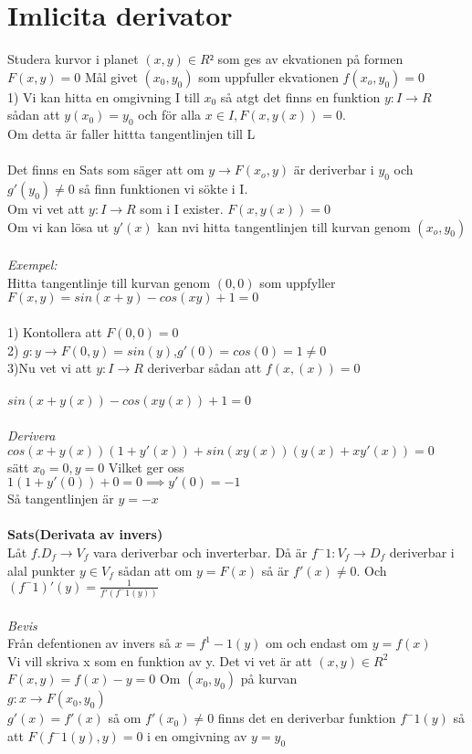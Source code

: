 \documentclass{article}
\begin{document}
	\section{Imlicita derivator} 
	Studera kurvor i planet $(x,y)\in R²$ som ges av ekvationen på formen $F(x,y)=0$
	Mål givet $(x_0,y_0)$ som uppfuller ekvationen $ f(x_o,y_0)=0 $ 
	\\
	1) Vi kan hitta en omgivning I till $x_0$ så atgt det finns en funktion $y:I\to R$ sådan att $y(x_0)=y_0$ och för alla $x\in I, F(x,y(x))=0$.\\
	Om detta är faller hittta tangentlinjen till L 
	\\\\
	Det finns en Sats som säger att om $y\to F(x_o,y)$ är deriverbar i $y_0$ och $g'(y_0)\neq 0$ så finn funktionen vi sökte i I.
	\\
	Om  vi vet att $y:I\to R$ som i I exister. $F(x,y(x))=0$
	\\
	Om vi kan lösa ut $y'(x)$ kan nvi hitta tangentlinjen till kurvan genom $(x_o,y_0)$
	\\\\
	\textit{Exempel:}
	\\
	Hitta tangentlinje till kurvan genom $(0,0)$ som uppfyller \\ $F(x,y)=sin(x+y)-cos(xy)+1=0$
	\\\\
	1) Kontollera att $F(0,0)=0$ \\
	2) $g:y\to F(0,y)=sin(y)$,$g'(0)=cos(0)=1\neq0$ \\
	3)Nu vet vi att $y:I\to R$ deriverbar sådan att $f(x,(x))=0$
	\\\\
	$sin(x+y(x))-cos(xy(x))+1=0$
	\\\\
	\textit{Derivera}
	\\
	$cos(x+y(x))(1+y'(x))+sin(xy(x))(y(x)+xy'(x))=0$ \\
	sätt $x_0=0,y=0$
	Vilket ger oss \\
	$1(1+y'(0))+0=0 \implies y'(0)=-1$ \\
	Så tangentlinjen är $y=-x$
	\\\\
	\textbf{Sats(Derivata av invers)}\\
	Låt $f.D_f\to V_f$ vara deriverbar och inverterbar.
	Då är $f^-1:V_f\to D_f$ deriverbar i alal punkter $y\in V_f$ sådan att om  $y=F(x)$ så är $f'(x)\neq0$. Och $(f^-1)'(y)=\frac{1}{f'(f^-1(y))}$
	\\\\
	\textit{Bevis}\\
	Från defentionen av invers så $x=f^1-1 (y)$ om och endast om $y=f(x)$ \\
	Vi vill skriva x som en funktion av y. Det vi vet är att $(x,y)\in R^2$\\ $F(x,y)=f(x)-y=0$
	Om $(x_0,y_0)$ på kurvan\\ $g:x\to F(x_0,y_0)$ \\ $g'(x)=f'(x)$ så om $f'(x_0)\neq0$ finns det en deriverbar funktion $f^-1 (y)$ så att $F(f^-1 (y),y)=0 $ i en omgivning av $y=y_0$
	
\end{document}

